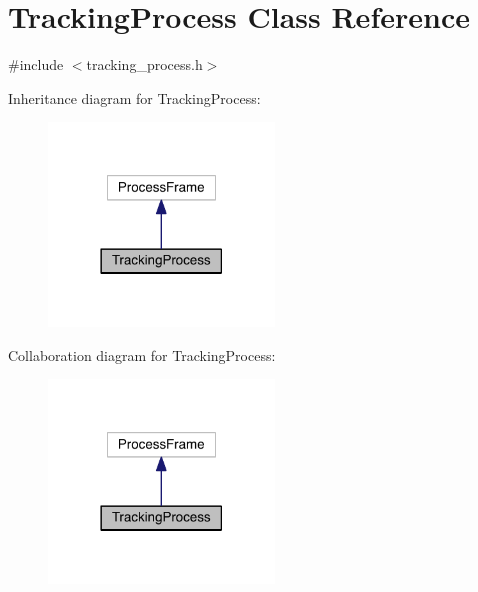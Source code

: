 \hypertarget{class_tracking_process}{}\section{Tracking\+Process Class Reference}
\label{class_tracking_process}


{\ttfamily \#include $<$tracking\+\_\+process.\+h$>$}



Inheritance diagram for Tracking\+Process\+:
\nopagebreak
\begin{figure}[H]
\begin{center}
\leavevmode
\includegraphics[width=170pt]{class_tracking_process__inherit__graph}
\end{center}
\end{figure}


Collaboration diagram for Tracking\+Process\+:
\nopagebreak
\begin{figure}[H]
\begin{center}
\leavevmode
\includegraphics[width=170pt]{class_tracking_process__coll__graph}
\end{center}
\end{figure}
